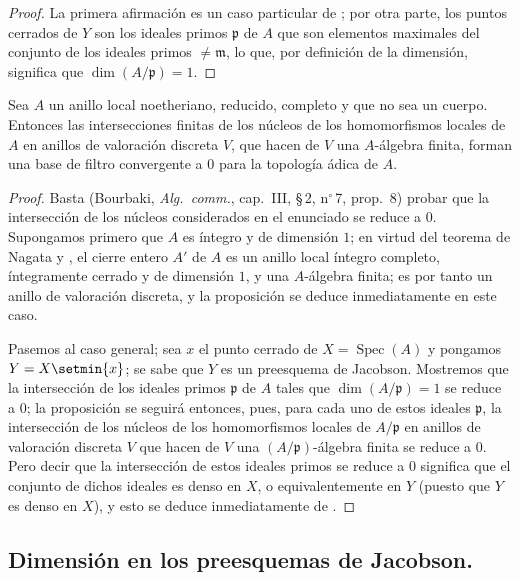 \begin{proof}
La primera afirmación es un caso particular de ; por otra parte, los puntos cerrados de $Y$ son los ideales primos $\mathfrak p$ de $A$ que son elementos maximales del conjunto de los ideales primos $\neq\mathfrak m$, lo que, por definición de la dimensión, significa que $\dim(A/\mathfrak p)=1$.
\end{proof}

\begin{proposition}[10.5.10]
\label{IV.10.5.10}
Sea $A$ un anillo local noetheriano, reducido, completo y que no sea un cuerpo.
Entonces las intersecciones finitas de los núcleos de los homomorfismos locales de $A$ en anillos de valoración discreta $V$, que hacen de $V$ una $A$-álgebra finita, forman una base de filtro convergente a $0$ para la topología ádica de $A$.
\end{proposition}

\begin{proof}
Basta (Bourbaki, \emph{Alg.\ comm.}, cap.~III, \S\,2, n$^\circ$\,7, prop.~8) probar que la intersección de los núcleos considerados en el enunciado se reduce a $0$.
Supongamos primero que $A$ es íntegro y de dimensión $1$; en virtud del teorema de Nagata  y , el cierre entero $A'$ de $A$ es un anillo local íntegro completo,
íntegramente cerrado y de dimensión $1$, y una $A$-álgebra finita; es por tanto un anillo de valoración discreta, y la proposición se deduce inmediatamente en este caso.

Pasemos al caso general; sea $x$ el punto cerrado de $X=\operatorname{Spec}(A)$ y pongamos $Y=X\setmin\{x\}$; se sabe  que $Y$ es un preesquema de Jacobson.
Mostremos que la intersección de los ideales primos $\mathfrak p$ de $A$ tales que $\dim(A/\mathfrak p)=1$ se reduce a $0$; la proposición se seguirá entonces, pues, para cada uno de estos ideales $\mathfrak p$, la intersección de los núcleos de los homomorfismos locales de $A/\mathfrak p$ en anillos de valoración discreta $V$ que hacen de $V$ una $(A/\mathfrak p)$-álgebra finita se reduce a $0$.
Pero decir que la intersección de estos ideales primos se reduce a $0$ significa que el conjunto de dichos ideales es denso en $X$, o equivalentemente en $Y$ (puesto que $Y$ es denso en $X$), y esto se deduce inmediatamente de .
\end{proof}

\subsection{Dimensión en los preesquemas de Jacobson.}
\label{subsection:IV.10.6}

